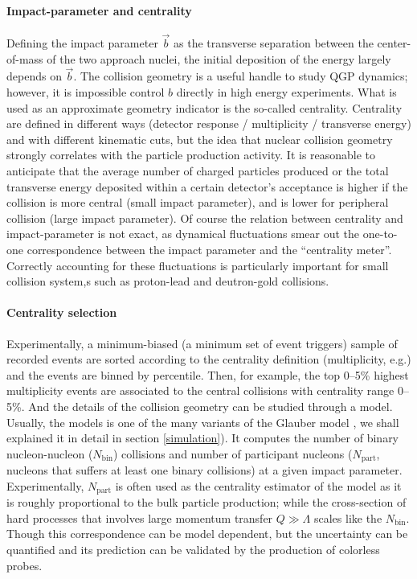 \paragraph{Impact-parameter and centrality} Defining the impact parameter $\vec{b}$ as the transverse separation between the center-of-mass of the two approach nuclei,
the initial deposition of the energy largely depends on $\vec{b}$.
The collision geometry is a useful handle to study QGP dynamics; however,
it is impossible control $b$ directly in high energy experiments.
What is used as an approximate geometry indicator is the so-called centrality.
Centrality are defined in different ways (detector response / multiplicity / transverse energy) and with different kinematic cuts, but the idea that  nuclear collision geometry strongly correlates with the particle production activity.
It is reasonable to anticipate that the average number of charged particles produced or the total transverse energy deposited within a certain detector's acceptance is higher if the collision is more central (small impact parameter), and is lower for peripheral collision (large impact parameter).
Of course the relation between centrality and impact-parameter is not exact, as dynamical fluctuations smear out the one-to-one correspondence between the impact parameter and the ``centrality meter''.
Correctly accounting for these fluctuations is particularly important for small collision system,s such as proton-lead and deutron-gold collisions.

\paragraph{Centrality selection} Experimentally, a minimum-biased (a minimum set of event triggers) sample of recorded events are sorted according to the centrality definition (multiplicity, e.g.) and the events are binned by percentile.
Then, for example, the top 0--5\% highest multiplicity events are associated to the central collisions with centrality range 0--5\%. 
And the details of the collision geometry can be studied through a model.
Usually, the models is one of the many variants of the Glauber model \cite{Miller:2007ri}, we shall explained it in detail in section \ref{simulation}).
It computes the number of binary nucleon-nucleon ($N_{\textrm{bin}}$) collisions and number of participant nucleons ($N_{\textrm{part}}$, nucleons that suffers at least one binary collisions) at a given impact parameter.
Experimentally, $N_{\textrm{part}}$ is often used as the centrality estimator of the model as it is roughly proportional to the bulk particle production; while the cross-section of hard processes that involves large momentum transfer $Q \gg \Lambda$ scales like the $N_{\textrm{bin}}$.
Though this correspondence can be model dependent, but the uncertainty can be quantified and its prediction can be validated by the production of colorless probes.


